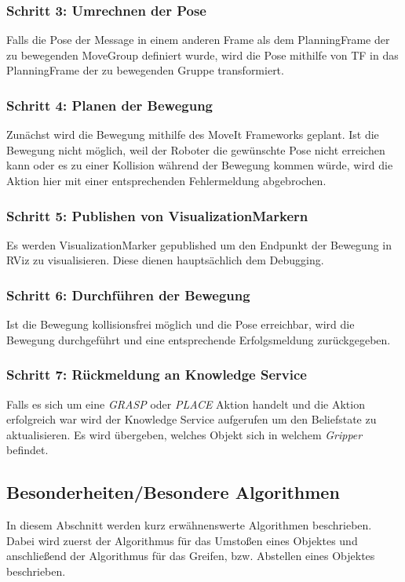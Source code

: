 \documentclass{suturo}
\begin{document}
\subsubsection{Schritt 3: Umrechnen der Pose}
Falls die Pose der Message in einem anderen Frame als dem PlanningFrame der zu bewegenden 
MoveGroup definiert wurde, wird die Pose mithilfe von TF in das PlanningFrame der zu bewegenden Gruppe transformiert.

\subsubsection{Schritt 4: Planen der Bewegung}
Zunächst wird die Bewegung mithilfe des MoveIt Frameworks geplant. Ist die Bewegung nicht möglich, weil der Roboter die gewünschte Pose nicht erreichen kann oder es zu einer Kollision während der Bewegung kommen würde, wird die Aktion hier mit einer entsprechenden Fehlermeldung abgebrochen.

\subsubsection{Schritt 5: Publishen von VisualizationMarkern}
Es werden VisualizationMarker gepublished um den Endpunkt der Bewegung in RViz zu visualisieren. Diese dienen hauptsächlich dem Debugging.

\subsubsection{Schritt 6: Durchführen der Bewegung}
Ist die Bewegung kollisionsfrei möglich und die Pose erreichbar, wird die Bewegung durchgeführt und eine entsprechende Erfolgsmeldung zurückgegeben.

\subsubsection{Schritt 7: Rückmeldung an Knowledge Service}
Falls es sich um eine \textit{GRASP} oder \textit{PLACE} Aktion handelt und die Aktion erfolgreich war wird der Knowledge Service aufgerufen um den Beliefstate zu aktualisieren. Es wird übergeben, welches Objekt sich in welchem \textit{Gripper} befindet.


\subsection{Besonderheiten/Besondere Algorithmen}
In diesem Abschnitt werden kurz erwähnenswerte Algorithmen beschrieben.
Dabei wird zuerst der Algorithmus für das Umstoßen eines Objektes und anschließend der Algorithmus für das Greifen, bzw. Abstellen eines Objektes beschrieben.\\
\end{document}
